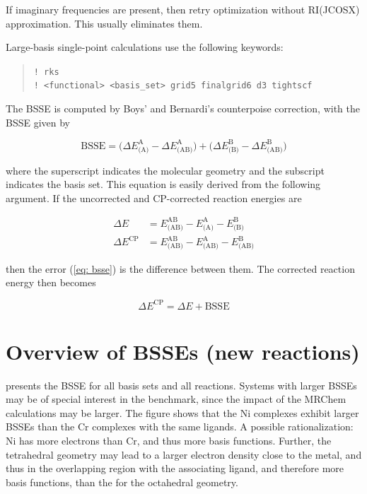 \documentclass[11pt,a4paper]{article}
\begin{document}
If imaginary frequencies are present, then retry optimization without RI(JCOSX) approximation.
This usually eliminates them.

Large-basis single-point calculations use the following keywords:

\begin{quote}
	\verb|! rks| \\
	\verb|! <functional> <basis_set> grid5 finalgrid6 d3 tightscf|
\end{quote}

The BSSE is computed by Boys' and Bernardi's counterpoise correction, with the BSSE given by

\begin{equation} \label{eq: bsse}
\text{BSSE} = \Big(\Delta E^{\text{A}}_{\text{(A)}} - \Delta E^{\text{A}}_{\text{(AB)}} \Big) + \Big( \Delta E^{\text{B}}_{\text{(B)}} - \Delta E^{\text{B}}_{\text{(AB)}}\Big )			
\end{equation}

where the superscript indicates the molecular geometry and the subscript indicates the basis set.
This equation is easily derived from the following argument.
If the uncorrected and CP-corrected reaction energies are

\begin{align} \label{eq: rxn uncorrected}
\Delta E &= E^{\text{AB}}_{\text{(AB)}} - E^{\text{A}}_{\text{(A)}} - E^{\text{B}}_{\text{(B)}} \\ \label{eq: rxn corrected}
\Delta E^{\text{CP}} &= E^{\text{AB}}_{\text{(AB)}} - E^{\text{A}}_{\text{(AB)}} - E^{\text{B}}_{\text{(AB)}}
\end{align}

then the error (\cref{eq: bsse}) is the difference between them.
The corrected reaction energy then becomes

\begin{equation} \label{eq: }
\Delta E^{\text{CP}} = \Delta E + \text{BSSE}
\end{equation}

\section{Overview of BSSEs (new reactions)}
 presents the BSSE for all basis sets and all reactions. 
Systems with larger BSSEs may be of special interest in the benchmark, since the impact of
the MRChem calculations may be larger.
The figure shows that the Ni complexes exhibit larger BSSEs than the Cr complexes with the same ligands.
A possible rationalization: Ni has more electrons than Cr, and thus more basis functions.
Further, the tetrahedral geometry may lead to a larger electron density close to the metal, and thus in the overlapping region with the associating ligand, and therefore more basis functions, than the for the octahedral geometry.
\end{document}
